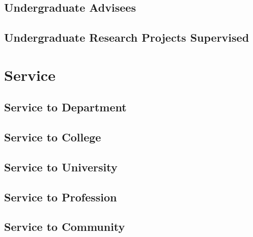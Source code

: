 \documentclass[10pt]{article}
\begin{document}
	\subsection{Undergraduate Advisees}
	\begin{enumerate}
		
	\end{enumerate}
	\subsection{Undergraduate Research Projects Supervised}
	\begin{enumerate}
		
	\end{enumerate}
\fi

\section{Service}
\iftrue
	\subsection{Service to Department}
    	\begin{description}
    		
    	\end{description}

	\subsection{Service to College}
    	\begin{description}
    		
    	\end{description}

	\subsection{Service to University}
    	\begin{description}
    		
    	\end{description}
\fi
	\subsection{Service to Profession}
    	\begin{description}
    		
        \end{description}
	\subsection{Service to Community}
    	\begin{description}
    		
        \end{description}
\end{document}
